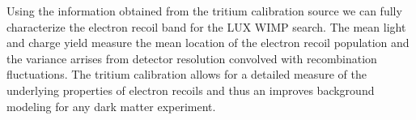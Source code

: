 Using the information obtained from the tritium calibration source we can fully characterize the electron recoil band for the LUX WIMP search. The mean light and charge yield measure the mean location of the electron recoil population and the variance arrises from detector resolution convolved with recombination fluctuations. The tritium calibration allows for a detailed measure of the underlying properties of electron recoils and thus an improves background modeling for any dark matter experiment.

